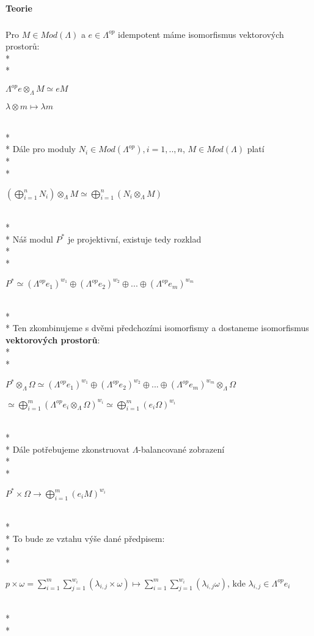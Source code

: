 \documentclass[7pt]{article}
\begin{document}
      \paragraph{Teorie}
         \subparagraph{}
         Pro $M\in Mod(\Lambda)$ a $e\in \Lambda^{op}$ idempotent máme isomorfismus 
vektorových prostorů:
         \\*\\*
         \centerline{$\Lambda^{op} e\otimes_\Lambda M\simeq eM$} \*
         \centerline{$\lambda\otimes m\mapsto \lambda m$} \\*\\*
         Dále pro moduly $N_i\in Mod(\Lambda^{op}),i=1,..,n$, $M\in Mod(\Lambda)$ platí 
         \\*\\*
         \centerline{$(\bigoplus_{i=1}^n N_i) \otimes_\Lambda M \simeq \bigoplus_{i=1}^n (N_i \otimes_\Lambda 
         M)$}\\*\\*
         Náš modul $P^*$ je projektivní, existuje tedy rozklad  \\*\\*
         \centerline{$P^*\simeq(\Lambda^{op} e_1)^{w_1}\oplus(\Lambda^{op} e_2)^{w_2}\oplus ... \oplus(\Lambda^{op} 
        e_m)^{w_m}$} \\*\\*
        Ten zkombinujeme s dvěmi předchozími isomorfismy a dostaneme isomorfismus 
        \textbf{vektorových prostorů}: \\*\\*
        \centerline{$
        P^*\otimes_\Lambda\Omega 
        \simeq (\Lambda^{op} e_1)^{w_1}\oplus(\Lambda^{op} e_2)^{w_2}\oplus ... \oplus(\Lambda^{op} 
        e_m)^{w_m}\otimes_\Lambda \Omega
        $}
        \centerline{$
        \simeq \bigoplus_{i=1}^m (\Lambda^{op} e_i \otimes_\Lambda \Omega)^{w_i}
        \simeq \bigoplus_{i=1}^m (e_i\Omega)^{w_i}
        $}\\*\\*
       Dále potřebujeme zkonstruovat $\Lambda$-balancované zobrazení \\*\\*
       \centerline{$P^*\times\Omega\rightarrow \bigoplus_{i=1}^m (e_iM)^{w_i}$} 
       \\*\\*
        To bude ze vztahu výše dané předpisem: \\*\\*
       \centerline{$
       p\times\omega=
       \sum_{i=1}^m\sum_{j=1}^{w_i}(\lambda_{i,j}\times\omega)
       \mapsto
       \sum_{i=1}^m\sum_{j=1}^{w_i}(\lambda_{i,j}\omega)
       $, kde $\lambda_{i,j}\in\Lambda^{op}e_i$}\\*\\*
\end{document}

